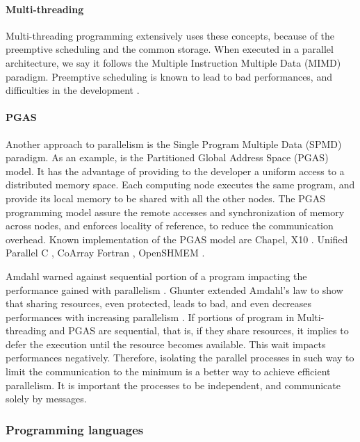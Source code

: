 \paragraph{Multi-threading}

Multi-threading programming extensively uses these concepts, because of the preemptive scheduling and the common storage.
When executed in a parallel architecture, we say it follows the Multiple Instruction Multiple Data (MIMD) paradigm.
Preemptive scheduling is known to lead to bad performances, and difficulties in the development \cite{Adya2002}.

\paragraph{PGAS}

Another approach to parallelism is the Single Program Multiple Data (SPMD) paradigm.
As an example, is the Partitioned Global Address Space (PGAS) model.
It has the advantage of providing to the developer a uniform access to a distributed memory space.
Each computing node executes the same program, and provide its local memory to be shared with all the other nodes.
The PGAS programming model assure the remote accesses and synchronization of memory across nodes, and enforces locality of reference, to reduce the communication overhead.
Known implementation of the PGAS model are 
Chapel\cite{Chamberlain2007},
X10 \cite{Charles2005}.
Unified Parallel C \cite{El-Ghazawi2006},
CoArray Fortran \cite{Numrich1998},
OpenSHMEM \cite{Chapman2010}.

Amdahl warned against sequential portion of a program impacting the performance gained with parallelism \cite{Amdahl1967}.
Ghunter extended Amdahl's law to show that sharing resources, even protected, leads to bad, and even decreases performances with increasing parallelism \cite{Gustafson1988,Gunther1993,Gunther1996,Nelson1996,Gunther2002}.
If portions of program in Multi-threading and PGAS are sequential, that is, if they share resources, it implies to defer the execution until the resource becomes available.
This wait impacts performances negatively.
Therefore, isolating the parallel processes in such way to limit the communication to the minimum is a better way to achieve efficient parallelism.
It is important the processes to be independent, and communicate solely by messages.


\subsubsection{Programming languages}

